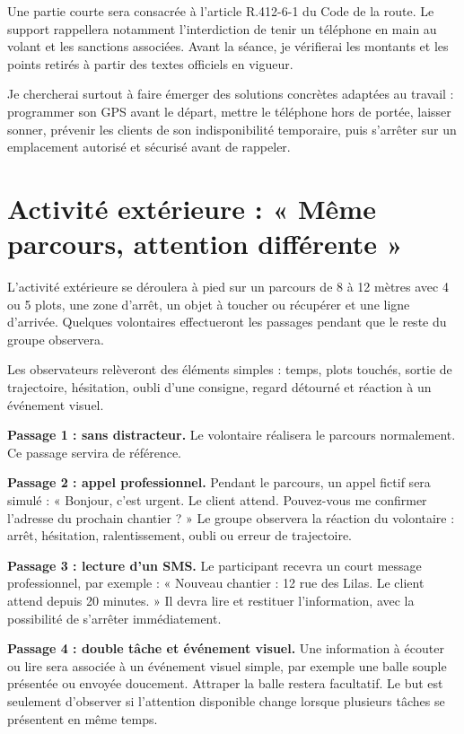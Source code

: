 Une partie courte sera consacrée à l’article R.412-6-1 du Code de la route. Le support rappellera notamment l’interdiction de tenir un téléphone en main au volant et les sanctions associées. Avant la séance, je vérifierai les montants et les points retirés à partir des textes officiels en vigueur.

Je chercherai surtout à faire émerger des solutions concrètes adaptées au travail : programmer son GPS avant le départ, mettre le téléphone hors de portée, laisser sonner, prévenir les clients de son indisponibilité temporaire, puis s’arrêter sur un emplacement autorisé et sécurisé avant de rappeler.

\section{Activité extérieure : « Même parcours, attention différente »}

L’activité extérieure se déroulera à pied sur un parcours de 8 à 12 mètres avec 4 ou 5 plots, une zone d’arrêt, un objet à toucher ou récupérer et une ligne d’arrivée. Quelques volontaires effectueront les passages pendant que le reste du groupe observera.

Les observateurs relèveront des éléments simples : temps, plots touchés, sortie de trajectoire, hésitation, oubli d’une consigne, regard détourné et réaction à un événement visuel.

\textbf{Passage 1 : sans distracteur.} Le volontaire réalisera le parcours normalement. Ce passage servira de référence.

\textbf{Passage 2 : appel professionnel.} Pendant le parcours, un appel fictif sera simulé : « Bonjour, c’est urgent. Le client attend. Pouvez-vous me confirmer l’adresse du prochain chantier ? » Le groupe observera la réaction du volontaire : arrêt, hésitation, ralentissement, oubli ou erreur de trajectoire.

\textbf{Passage 3 : lecture d’un SMS.} Le participant recevra un court message professionnel, par exemple : « Nouveau chantier : 12 rue des Lilas. Le client attend depuis 20 minutes. » Il devra lire et restituer l’information, avec la possibilité de s’arrêter immédiatement.

\textbf{Passage 4 : double tâche et événement visuel.} Une information à écouter ou lire sera associée à un événement visuel simple, par exemple une balle souple présentée ou envoyée doucement. Attraper la balle restera facultatif. Le but est seulement d’observer si l’attention disponible change lorsque plusieurs tâches se présentent en même temps.

